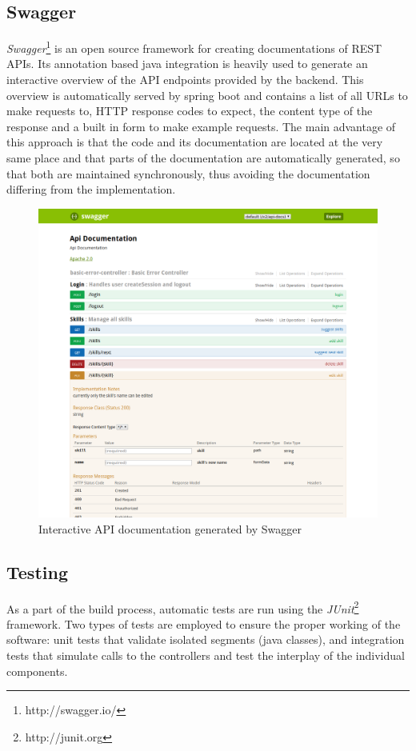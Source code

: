 \subsection{Swagger}
\textit{Swagger}\footnote{http://swagger.io/} is an open source framework for creating documentations of REST APIs.
Its annotation based java integration is heavily used to generate an interactive overview of the API endpoints provided by the
backend. This overview is automatically served by spring boot and contains a list of all URLs to make requests to, HTTP response codes to expect, the content type of the response and a built in form to make example requests. The main advantage of this approach is that the code and its documentation are located at the very same place and that parts of the documentation are automatically generated, so that both are maintained synchronously, thus avoiding the documentation differing from the implementation.
\begin{figure}[H]
    \centering
    \includegraphics[width=\textwidth]{images/swagger_ui.png}
    \caption[Swagger Interactive Documentation]{Interactive API documentation generated by Swagger}
    \label{fig:markovchain}
\end{figure}

\subsection{Testing}
As a part of the build process, automatic tests are run using the \textit{JUnit}\footnote{http://junit.org} framework. Two types of tests are employed to ensure the proper working of the software: unit tests that validate isolated segments (java classes), and integration tests that simulate calls to the controllers and test the
interplay of the individual components.

